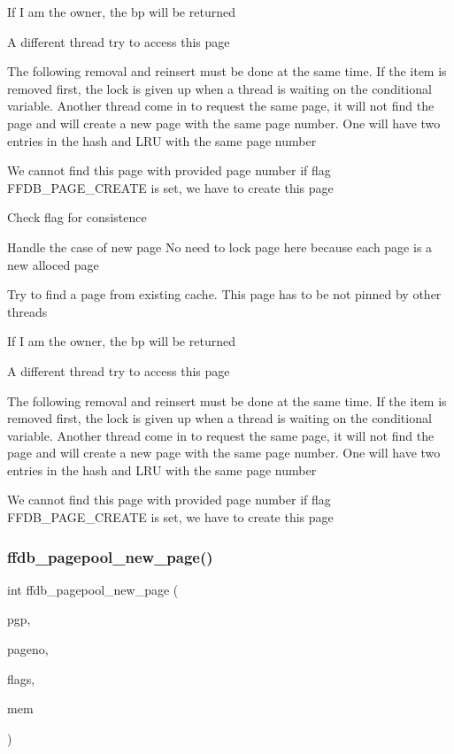 If I am the owner, the bp will be returned

A different thread try to access this page

The following removal and reinsert must be done at the same time. If the item is removed first, the lock is given up when a thread is waiting on the conditional variable. Another thread come in to request the same page, it will not find the page and will create a new page with the same page number. One will have two entries in the hash and L\+RU with the same page number

We cannot find this page with provided page number if flag F\+F\+D\+B\+\_\+\+P\+A\+G\+E\+\_\+\+C\+R\+E\+A\+TE is set, we have to create this page

Check flag for consistence

Handle the case of new page No need to lock page here because each page is a new alloced page

Try to find a page from existing cache. This page has to be not pinned by other threads

If I am the owner, the bp will be returned

A different thread try to access this page

The following removal and reinsert must be done at the same time. If the item is removed first, the lock is given up when a thread is waiting on the conditional variable. Another thread come in to request the same page, it will not find the page and will create a new page with the same page number. One will have two entries in the hash and L\+RU with the same page number

We cannot find this page with provided page number if flag F\+F\+D\+B\+\_\+\+P\+A\+G\+E\+\_\+\+C\+R\+E\+A\+TE is set, we have to create this page\mbox{\label{adat-devel_2other__libs_2filedb_2filehash_2ffdb__pagepool_8h_a64907f28abdad3f859641b235e76bb42}} 
\subsubsection{\texorpdfstring{ffdb\_pagepool\_new\_page()}{ffdb\_pagepool\_new\_page()}}
{\footnotesize\ttfamily int ffdb\+\_\+pagepool\+\_\+new\+\_\+page (\begin{DoxyParamCaption}\item[{\mbox{\hyperlink{adat-devel_2other__libs_2filedb_2filehash_2ffdb__pagepool_8h_a73290f737b0e5f8be90a0fa96ddf6ab6}{ffdb\+\_\+pagepool\+\_\+t}} $\ast$}]{pgp,  }\item[{\mbox{\hyperlink{adat-devel_2other__libs_2filedb_2filehash_2ffdb__db_8h_a000813331643d38481142bcce7de1501}{pgno\+\_\+t}} $\ast$}]{pageno,  }\item[{unsigned int}]{flags,  }\item[{void $\ast$$\ast$}]{mem }\end{DoxyParamCaption})}

